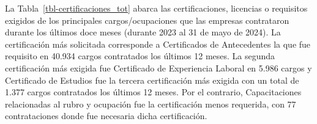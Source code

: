 \documentclass[
  11pt,
]{article}
\begin{document}
\begin{table}

\caption{\label{tbl-contratados_u12_educ}Nivel educacional de
ocupaciones contratadas los últimos doce meses}


\end{table}%

La Tabla~\ref{tbl-certificaciones_tot} abarca las certificaciones,
licencias o requisitos exigidos de los principales cargos/ocupaciones
que las empresas contrataron durante los últimos doce meses (durante
2023 al 31 de mayo de 2024). La certificación más solicitada corresponde
a Certificados de Antecedentes la que fue requisito en 40.934 cargos
contratados los últimos 12 meses. La segunda certificación más exigida
fue Certificado de Experiencia Laboral en 5.986 cargos y Certificado de
Estudios fue la tercera certificación más exigida con un total de 1.377
cargos contratados los últimos 12 meses. Por el contrario,
Capacitaciones relacionadas al rubro y ocupación fue la certificación
menos requerida, con 77 contrataciones donde fue necesaria dicha
certificación.
\end{document}
